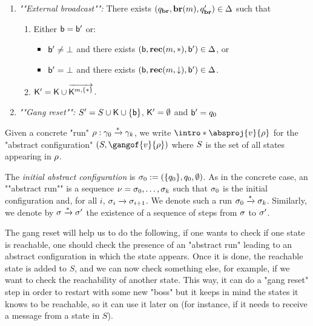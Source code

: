 \begin{definition}
\begin{enumerate}
		
		\item \emph{""External broadcast"":} There exists $(q_{\textbf{br}}, \textbf{br}(m), q_{\textbf{br}}') \in \Delta$ such that
		\begin{enumerate}[label = (\arabic*)]
			
			\item\label{item:external_broadcast_boss}Either $\mathsf{b} = \mathsf{b}'$ or:
			\begin{itemize} 
				\item $\mathsf{b}' \ne \bot$ and there exists $(\mathsf{b}, \textbf{rec}(m, {*}), \mathsf{b}') \in \Delta$, or
				\item $\mathsf{b}' = \bot$ and there exists $(\mathsf{b}, \textbf{rec}(m, \downarrow), \mathsf{b}') \in \Delta$.
			\end{itemize}
			
			\item\label{item:external_broadcast_clique} $\mathsf{K}'= \mathsf{K} \cup \overrightarrow{\mathsf{K}^{m,\{{*}\}}}$.
			
		\end{enumerate}
		\item \emph{""Gang reset"":} $S' = S \cup \mathsf{K} \cup \{\mathsf{b}\}$, $\mathsf{K}' = \emptyset$ and $\mathsf{b}'= q_0$
	\end{enumerate}
	
	
	Given a concrete "run" $\rho: \gamma_0 \xrightarrow{*} \gamma_k$, we write \AP  $\intro*\absproj{\aval}{\run}$ for the "abstract configuration" $(\covset, \gangof{\aval}{\run})$ where $S$ is the set of all states appearing in $\rho$. 
	
	The \emph{initial abstract configuration} is $\sigma_0 := (\{q_0\}, q_0, \emptyset)$. 
	As in the concrete case, an ""abstract run"" is a sequence $\nu = \sigma_0, \dots, \sigma_k$ such that $\sigma_0$ is the initial configuration and, for all $i$, $\sigma_i \xrightarrow{} \sigma_{i+1}$. We denote such a run $\sigma_0 \xrightarrow{*} \sigma_k$. Similarly, we denote by $\sigma \xrightarrow{*} \sigma'$ the existence of a sequence of steps from $\sigma$ to $\sigma'$.
\end{definition}

The gang reset will help us to do the following, if one wants to check if one state is reachable, one should check the presence of an "abstract run" leading to an abstract configuration in which the state appears. Once it is done, the reachable state is added to $S$, and we can  now check something else, for example, if we want to check the reachability of another state. This way, it can do a "gang reset" step in order to restart with some new "boss" but it keeps in mind the states it knows to be reachable, so it can use it later on (for instance, if it needs to receive a message from a state in $S$).

